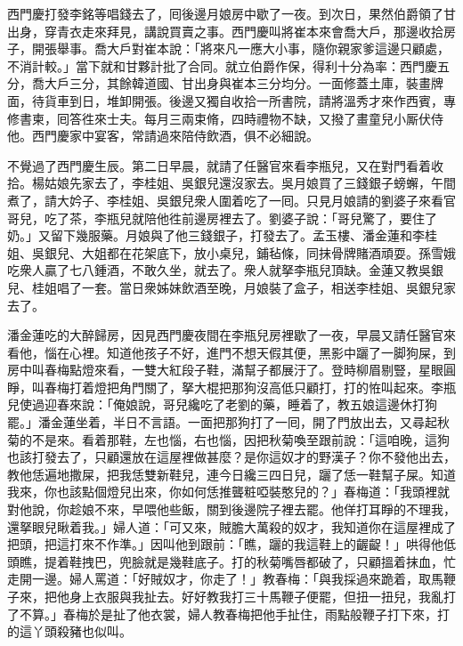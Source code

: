西門慶打發李銘等唱錢去了，囘後邊月娘房中歇了一夜。到次日，果然伯爵領了甘出身，穿青衣走來拜見，講說買賣之事。西門慶叫將崔本來會喬大戶，那邊收拾房子，開張舉事。喬大戶對崔本說：「將來凡一應大小事，隨你親家爹這邊只顧處，不消計較。」當下就和甘夥計批了合同。就立伯爵作保，得利十分為率：西門慶五分，喬大戶三分，其餘韓道國、甘出身與崔本三分均分。一面修蓋土庫，裝畫牌面，待貨車到日，堆卸開張。後邊又獨自收拾一所書院，請將溫秀才來作西賓，專修書柬，囘答徃來士夫。每月三兩束脩，四時禮物不缺，又撥了畫童兒小厮伏侍他。{}西門慶家中宴客，常請過來陪侍飲酒，俱不必細說。

不覺過了西門慶生辰。第二日早晨，就請了任醫官來看李瓶兒，又在對門看着收拾。楊姑娘先家去了，李桂姐、吳銀兒還沒家去。吳月娘買了三錢銀子螃蠏，午間煮了，請大妗子、李桂姐、吳銀兒衆人圍着吃了一囘。只見月娘請的劉婆子來看官哥兒，吃了茶，李瓶兒就陪他徃前邊房裡去了。劉婆子說：「哥兒驚了，要住了奶。」又留下幾服藥。月娘與了他三錢銀子，打發去了。孟玉樓、潘金蓮和李桂姐、吳銀兒、大姐都在花架底下，放小桌兒，鋪毡條，同抹骨牌賭酒頑耍。孫雪娥吃衆人贏了七八鍾酒，不敢久坐，就去了。衆人就拏李瓶兒頂缺。金蓮又教吳銀兒、桂姐唱了一套。當日衆姊妹飲酒至晚，月娘裝了盒子，相送李桂姐、吳銀兒家去了。

潘金蓮吃的大醉歸房，因見西門慶夜間在李瓶兒房裡歇了一夜，早晨又請任醫官來看他，惱在心裡。知道他孩子不好，進門不想天假其便，黑影中躧了一脚狗屎，到房中叫春梅點燈來看，一雙大紅段子鞋，滿幫子都展汙了。登時柳眉剔豎，星眼圓睜，叫春梅打着燈把角門關了，拏大棍把那狗沒高低只顧打，打的恠叫起來。李瓶兒使過迎春來說：「俺娘說，哥兒纔吃了老劉的藥，睡着了，教五娘這邊休打狗罷。」潘金蓮坐着，半日不言語。一面把那狗打了一囘，開了門放出去，又尋起秋菊的不是來。看着那鞋，左也惱，右也惱，因把秋菊喚至跟前說：「這咱晚，這狗也該打發去了，只顧還放在這屋裡做甚麼？是你這奴才的野漢子？你不發他出去，教他恁遍地撒屎，{}把我恁雙新鞋兒，連今日纔三四日兒，躧了恁一鞋幫子屎。知道我來，你也該點個燈兒出來，你如何恁推聾粧啞裝憨兒的？」春梅道：「我頭裡就對他說，你趁娘不來，早喂他些飯，關到後邊院子裡去罷。他佯打耳睜的不理我，還拏眼兒瞅着我。」婦人道：「可又來，賊膽大萬殺的奴才，我知道你在這屋裡成了把頭，把這打來不作準。」因叫他到跟前：「瞧，躧的我這鞋上的齷齪！」哄得他低頭瞧，提着鞋拽巴，兜臉就是幾鞋底子。打的秋菊嘴唇都破了，只顧搵着抹血，忙走開一邊。婦人罵道：「好賊奴才，你走了！」教春梅：「與我採過來跪着，取馬鞭子來，把他身上衣服與我扯去。好好教我打三十馬鞭子便罷，但扭一扭兒，我亂打了不算。」春梅於是扯了他衣裳，婦人教春梅把他手扯住，雨點般鞭子打下來，打的這丫頭殺豬也似叫。

